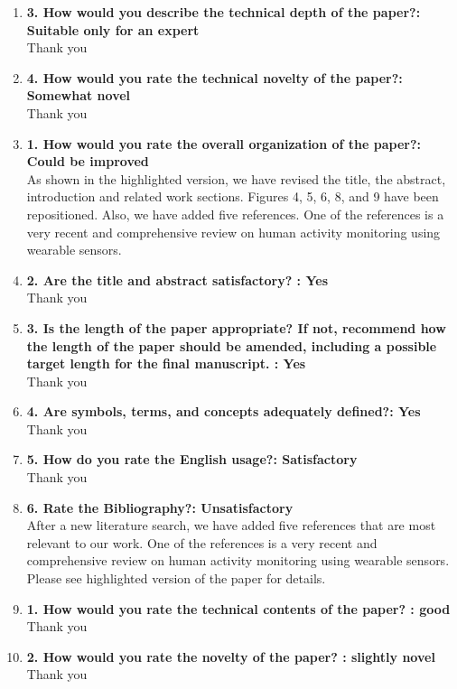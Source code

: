 \documentclass[11pt]{article}
\begin{document}
\begin{enumerate}
\item\textbf{3. How would you describe the technical depth of the paper?: Suitable only for an expert}\\
Thank you

\item\textbf{4. How would you rate the technical novelty of the paper?: Somewhat novel}\\
Thank you

\item \textbf{1. How would you rate the overall organization of the paper?: Could be improved
}\\
As shown in the highlighted version, we have revised the title, the abstract, introduction and related work sections. Figures 4, 5, 6, 8, and 9 have been repositioned.  Also, we have added five references. One of the references is a very recent and comprehensive review on human activity monitoring using wearable sensors.
\item \textbf{2. Are the title and abstract satisfactory? : Yes
}\\
Thank you

\item\textbf{3. Is the length of the paper appropriate? If not, recommend how the length of the paper should be amended, including a possible target length for the final manuscript. : Yes}\\
Thank you

\item\textbf{4. Are symbols, terms, and concepts adequately defined?: Yes}\\
Thank you

\item\textbf{5. How do you rate the English usage?: Satisfactory}\\
Thank you

\item\textbf{6. Rate the Bibliography?: Unsatisfactory}\\
After a new literature search, we have added five references that are most relevant to our work. One of the references is a very recent and comprehensive review on human activity monitoring using wearable sensors. Please see highlighted version of the paper for details.

\item\textbf{1. How would you rate the technical contents of the paper? : good}\\
Thank you

\item \textbf{2. How would you rate the novelty of the paper? : slightly novel}\\
Thank you


\end{enumerate}
\end{document}
